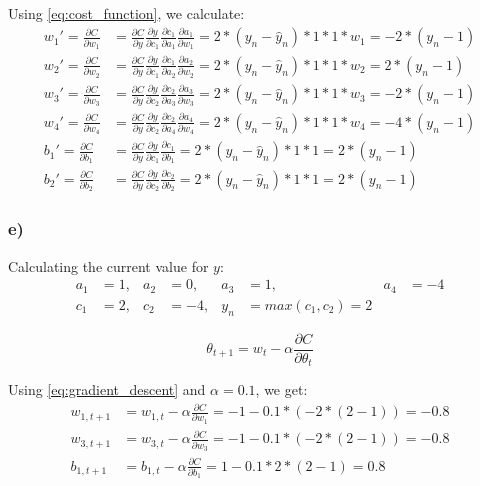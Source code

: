 Using \cref{eq:cost_function}, we calculate: 
\begin{align*}
        w_1' = \frac{ \partial C}{\partial w_1} 
    &= \frac{\partial C}{\partial y} \frac{\partial y}{\partial c_1} 
    \frac{\partial c_1}{\partial a_1} \frac{\partial a_1}{\partial w_1}
    = 2 * (y_n - \hat{y}_n) * 1 * 1 * w_1 = - 2 * (y_n - 1) \\
        w_2' = \frac{\partial C}{\partial w_2} 
    &= \frac{\partial C}{\partial y} \frac{\partial y}{\partial c_1} 
    \frac{\partial c_1}{\partial a_2} \frac{\partial a_2}{\partial w_2}
    = 2 * (y_n - \hat{y}_n) * 1 * 1 * w_2 = 2 * (y_n - 1) \\
        w_3' = \frac{\partial C}{\partial w_3} 
    &= \frac{\partial C}{\partial y} \frac{\partial y}{\partial c_2} 
    \frac{\partial c_2}{\partial a_3} \frac{\partial a_3}{\partial w_3}
    = 2 * (y_n - \hat{y}_n) * 1 * 1 * w_3 = - 2 * (y_n - 1) \\
        w_4' = \frac{\partial C}{\partial w_4} 
    &= \frac{\partial C}{\partial y} \frac{\partial y}{\partial c_2} 
    \frac{\partial c_2}{\partial a_4} \frac{\partial a_4}{\partial w_4}
    = 2 * (y_n - \hat{y}_n) * 1 * 1 * w_4 = - 4 * (y_n - 1) \\
        b_1' = \frac{\partial C}{\partial b_1} 
    &= \frac{\partial C}{\partial y} \frac{\partial y}{\partial c_1} 
    \frac{\partial c_1}{\partial b_1} 
    = 2 * (y_n - \hat{y}_n) * 1 * 1 = 2 * (y_n - 1) \\ 
        b_2' = \frac{\partial C}{\partial b_2}
    &= \frac{\partial C}{\partial y} \frac{\partial y}{\partial c_2} 
    \frac{\partial c_2}{\partial b_2} 
    = 2 * (y_n - \hat{y}_n) * 1 * 1 = 2 * (y_n - 1) 
\end{align*}

\subsubsection*{e)}
Calculating the current value for $y$: 
\begin{align*}
    a_1 &= 1,& a_2 &= 0,& a_3 &= 1,& a_4 &= -4 \\
    c_1 &= 2,& c_2 &= -4,& y_n  &= max(c_1, c_2) = 2
\end{align*}

\begin{equation}
    \label{eq:gradient_descent}
    \theta_{t+1} = w_t - \alpha \frac{\partial C}{\partial \theta_t}
\end{equation}

Using \cref{eq:gradient_descent} and $\alpha = 0.1$, we get: 
\begin{align*}
    w_{1, t + 1} 
    &= w_{1, t} - \alpha \frac{ \partial C}{\partial w_1} 
     = -1 - 0.1 * ( - 2 * (2 - 1)) = - 0.8 \\
    w_{3, t + 1} 
    &= w_{3, t} - \alpha \frac{ \partial C}{\partial w_3} 
     = -1 - 0.1 * (- 2 * (2 - 1)) = - 0.8 \\
    b_{1, t + 1} 
    &= b_{1, t} - \alpha \frac{ \partial C}{\partial b_1} 
     = 1 - 0.1 * 2 * (2 - 1) = 0.8
\end{align*}

